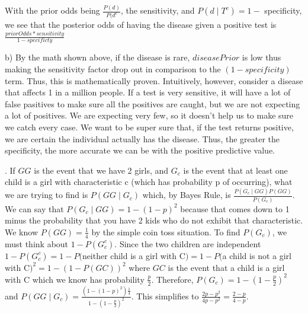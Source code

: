 \documentclass[11pt]{article}
\begin{document}
	With the prior odds being $\frac{P(d)}{P(d^c}$, the sensitivity, and $P(d \mid T^c) = 1 - $ specificity, we see that the posterior odds of having the disease given a positive test is $\frac{priorOdds*sensitivity}{1-specificty}$

	
\smallskip


	b) By the math shown above, if the disease is rare, $diseasePrior$ is low thus making the sensitivity factor drop out in comparison to the $(1-specificity)$ term.  Thus, this is mathematically proven.  
	Intuitively, however, consider a disease that affects 1 in a million people.  If a test is very sensitive, it will have a lot of false pasitives to make sure all the positives are caught, but we are not expecting a lot of positives.  We are expecting very few, so it doesn't help us to make sure we catch every case.  We want to be super sure that, if the test returns positive, we are certain the individual actually has the disease. Thus, the greater the specificity, the more accurate we can be with the positive predictive value.

\bigskip

. If $GG$ is the event that we have 2 girls, and $G_c$ is the event that at least one child is a girl with characteristic c (which has probability p of occurring), what we are trying to find is $P(GG \mid G_c)$ which, by Bayes Rule, is $\frac{P(G_c \mid GG)P(GG)}{P(G_c)}$. We can say that $P(G_c \mid GG) = 1-(1-p)^{2}$ because that comes down to 1 minus the probability that you have 2 kids who do not exhibit that characteristic.  
We know $P(GG) = \frac{1}{4}$ by the simple coin toss situation.  
To find $P(G_c)$, we must think about $1-P(G_c^c)$.  Since the two children are independent $1-P(G_c^c) = 1- P($neither child is a girl with C$) = 1- P($a child is not a girl with C$)^2 = 1 - (1-P(GC))^2$ where $GC$ is the event that a child is a girl with C which we know has probability $\frac{p}{2}$.  Therefore, $P(G_c) = 1-(1-\frac{p}{2})^2$ and $P(GG \mid G_c) = \frac{(1-(1-p)^2)\frac{1}{4}}{1-(1-\frac{p}{2})^2}$.  This simplifies to $\frac{2p - p^2}{4p-p^2} = \frac{2-p}{4-p}$.
\end{document}
